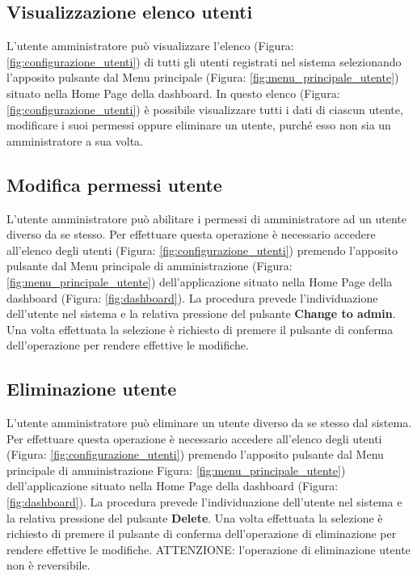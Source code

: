 	\pagebreak
	\subsection{Visualizzazione elenco utenti}
		L'utente amministratore può visualizzare l'elenco (Figura: \ref{fig:configurazione_utenti}) di tutti gli utenti registrati nel sistema selezionando l'apposito pulsante dal Menu principale (Figura: \ref{fig:menu_principale_utente}) situato nella Home Page della dashboard\gloss{}.
		In questo elenco (Figura: \ref{fig:configurazione_utenti}) è possibile visualizzare tutti i dati di ciascun utente, modificare  i suoi permessi oppure eliminare un utente, purché esso non sia un amministratore a sua volta.

	
	\subsection{Modifica permessi utente}
		L'utente amministratore può abilitare i permessi di amministratore ad un utente diverso da se stesso.\newline
		Per effettuare questa operazione è necessario accedere all'elenco degli utenti (Figura: \ref{fig:configurazione_utenti}) premendo l'apposito pulsante dal Menu principale di amministrazione (Figura: \ref{fig:menu_principale_utente}) dell'applicazione situato nella Home Page della dashboard (Figura: \ref{fig:dashboard}).
		La procedura prevede l'individuazione dell'utente nel sistema e la relativa pressione del pulsante \textbf{Change to admin}.\newline
		Una volta effettuata la selezione è richiesto di premere il pulsante di conferma dell'operazione per rendere effettive le modifiche.

	
	\subsection{Eliminazione utente}
		L'utente amministratore può eliminare un utente diverso da se stesso dal sistema.\newline
		Per effettuare questa operazione è necessario accedere all'elenco degli utenti (Figura: \ref{fig:configurazione_utenti}) premendo l'apposito pulsante dal Menu principale di amministrazione Figura: \ref{fig:menu_principale_utente}) dell'applicazione situato nella Home Page della dashboard (Figura: \ref{fig:dashboard}).
		La procedura prevede l'individuazione dell'utente nel sistema e la relativa pressione del pulsante \textbf{Delete}.\newline
		Una volta effettuata la selezione è richiesto di premere il pulsante di conferma dell'operazione di eliminazione per rendere effettive le modifiche.\newline
		ATTENZIONE: l'operazione di eliminazione utente non è reversibile.
		

